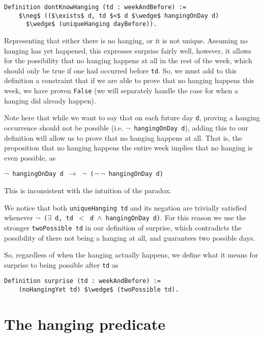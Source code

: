 \documentclass[runningheads]{llncs}
\begin{document}
\begin{lstlisting}[mathescape=true]
  Definition dontKnowHanging (td : weekAndBefore) :=
    $\neg$ (($\exists$ d, td $<$ d $\wedge$ hangingOnDay d)
      $\wedge$ (uniqueHanging dayBefore)).
\end{lstlisting}

Representing that either there is no hanging, or it is not unique. Assuming no
hanging has yet happened, this expresses surprise fairly
well, however, it allows for the possibility that no hanging happens at all in the
rest of the week, which should only be true if one had occurred before {\tt td}.
So, we must add to this definition a constraint that if we are able to prove that no
hanging happens this week, we have proven {\tt False} (we will separately handle the case for when
a hanging did already happen).

Note here that while we want to say that on each future day {\tt d}, proving a hanging
occurrence should not be possible (i.e. {\tt $\neg$ hangingOnDay d}), adding this to
our definition will allow us to
prove that no hanging happens at all.
That is, the proposition that no hanging happens the entire week implies that no
hanging is even possible, as \newline

{\tt $\neg$ hangingOnDay d $\to$ $\neg$ ($\neg~\neg$ hangingOnDay d)} \newline

This is inconsistent with the intuition of the paradox.

We notice that both {\tt uniqueHanging td} and its negation are trivially
satisfied whenever {\tt $\neg$ ($\exists$ d, td $<$ d $\wedge$ hangingOnDay d)}. For this
reason we use the stronger {\tt twoPossible td} in our definition of surprise,
which contradicts the possibility of there not being a hanging at all, and
guarantees two possible days.

So, regardless of when the hanging actually happens, we define what it means
for surprise to being possible after {\tt td} as

\begin{lstlisting}[mathescape=true]
  Definition surprise (td : weekAndBefore) :=
    (noHangingYet td) $\wedge$ (twoPossible td).
\end{lstlisting}

\section{The hanging predicate}
\label{sec:predicate}
\end{document}
